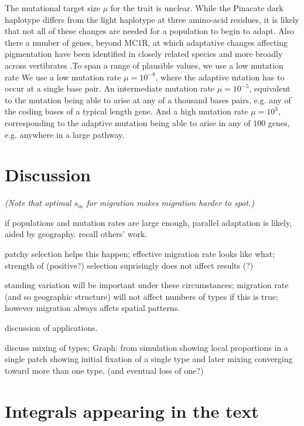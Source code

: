 \documentclass{article}
\newcommand{\plr}[1]{{\it\color{blue}(#1)}}
\begin{document}
The mutational target size $\mu$ for the trait is unclear. 
While the Pinacate dark haplotype differs from the light haplotype at three amino-acid residues,
it is likely that not all of these changes are needed for a population to begin to  
adapt. Also there a number of genes, beyond MC1R, at which adaptative changes affecting 
pigmentation have been identified in closely related species and more
broadly across vertibrates \citep{}.To span a range of plausible
values, we use a low mutation rate 
We use a low mutation rate $\mu= 10^{-8}$, where the adaptive
mtation has to occur at a single base pair.
An intermediate mutation rate $\mu= 10^{-5}$, equivalent to
the mutation being able to arise at any of a thousand bases pairs,
e.g. any of the coding bases of a typical length gene. And a high
mutation rate $\mu = 10^{3}$, corresponding to the adaptive mutation
being able to arise in any of $100$ genes, e.g. anywhere in a large pathway. 


\section{Discussion} 

\plr{Note that optimal $s_m$ for migration makes migration harder to spot.}

if populations and mutation rates are large enough, parallel adaptation is likely, aided by geography. 
recall others' work. 

patchy selection helps this happen; 
effective migration rate looks like what; 
strength of (positive?) selection suprisingly does not affect results (?) 

standing variation will be important under these circumstances; 
migration rate (and so geographic structure) will not affect numbers of types if this is true; 
however migration always affcts spatial patterns. 

discussion of applications. 

discuss mixing of types; 
Graph: from simulation showing local proportions in a single patch showing initial fixation of a single type and later mixing converging toward more than one type.  (and eventual loss of one?)



\appendix

\section{Integrals appearing in the text}
    \label{apx:integrals}
\end{document}
